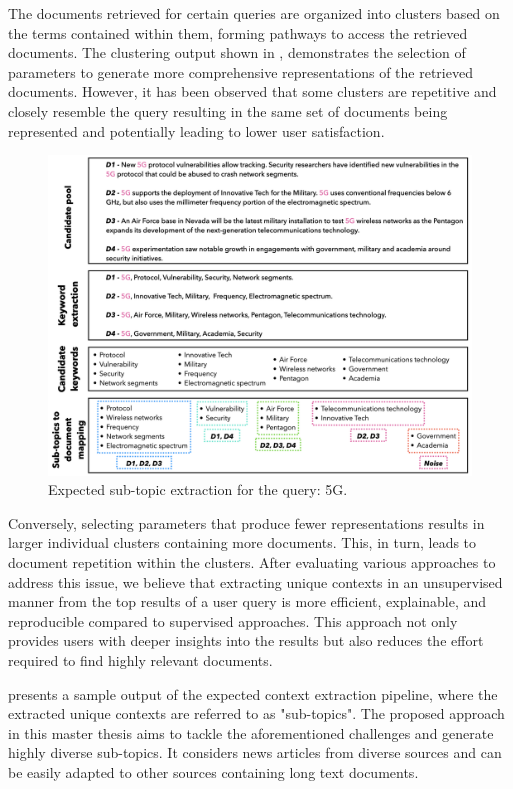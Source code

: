 The documents retrieved for certain queries are organized into clusters based on the terms contained within them, forming pathways to access the retrieved documents. The clustering output shown in , demonstrates the selection of parameters to generate more comprehensive representations of the retrieved documents. However, it has been observed that some clusters are repetitive and closely resemble the query resulting in the same set of documents being represented and potentially leading to lower user satisfaction.

\begin{figure}[h]
	\centering
	\includegraphics[width=.99\textwidth]{images/keynotes_images/high_level_approach}
	\caption[Expected sub-topic retrieval.]{Expected sub-topic extraction for the query: 5G. \label{fig:proposal_idea}}
\end{figure}

Conversely, selecting parameters that produce fewer representations results in larger individual clusters containing more documents. This, in turn, leads to document repetition within the clusters. After evaluating various approaches to address this issue, we believe that extracting unique contexts in an unsupervised manner from the top results of a user query is more efficient, explainable, and reproducible compared to supervised approaches. This approach not only provides users with deeper insights into the results but also reduces the effort required to find highly relevant documents. 

 presents a sample output of the expected context extraction pipeline, where the extracted unique contexts are referred to as "sub-topics". The proposed approach in this master thesis aims to tackle the aforementioned challenges and generate highly diverse sub-topics. It considers news articles from diverse sources and can be easily adapted to other sources containing long text documents.



